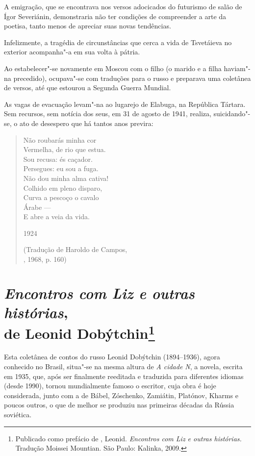 A emigração, que se encontrava nos versos adocicados do
futurismo de salão de Ígor Severiánin, demonstraria não ter
condições de compreender a arte da poetisa, tanto menos de
apreciar suas novas tendências.

Infelizmente, a tragédia de circunstâncias que cerca a vida de
Tsvetáieva no exterior acompanha"-a em sua volta à pátria.

Ao estabelecer"-se novamente em Moscou com o filho (o marido e a
filha haviam"-na precedido), ocupava"-se com traduções para o
russo e preparava uma coletânea de versos, até que estourou a
Segunda Guerra Mundial.

As vagas de evacuação levam"-na ao lugarejo de Elabuga, na
República Tártara. Sem recursos, sem notícia dos seus, em 31
de agosto de 1941, realiza, suicidando"-se, o ato de desespero
que há tantos anos previra:

\pagebreak

\begin{verse}
Não roubarás minha cor \\
Vermelha, de rio que estua. \\
Sou recusa: és caçador. \\
Persegues: eu sou a fuga. \\[8pt]
Não dou minha alma cativa! \\
Colhido em pleno disparo, \\
Curva a pescoço o cavalo \\
Árabe --- \\
E abre a veia da vida. 

1924

(Tradução de Haroldo de Campos,\\
, 1968, p. 160)

\end{verse}

\chapter{\emph{Encontros com Liz e outras histórias},\\
de Leonid Dobýtchin\footnote{Publicado como prefácio de \protect{},
Leonid. \emph{Encontros com Liz e outras histórias.} Tradução
Moissei Mountian. São Paulo: Kalinka, 2009.}}
\label{liz}

Esta coletânea de contos do russo Leonid Dobýtchin (1894--1936), agora
conhecido no Brasil, situa"-se na mesma altura de \emph{A cidade N}, a
novela, escrita em 1935, que, após ser finalmente reeditada e traduzida
para diferentes idiomas (desde 1990), tornou mundialmente famoso o
escritor, cuja obra é hoje considerada, junto com a de Bábel, Zóschenko,
Zamiátin, Platónov, Kharms e poucos outros, o que de melhor se produziu
nas primeiras décadas da Rússia soviética.

